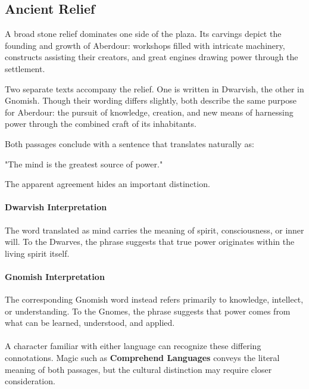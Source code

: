 \subsection*{Ancient Relief}
{\entryfont A broad stone relief dominates one side of the plaza. Its carvings depict the founding and growth of Aberdour: workshops filled with intricate machinery, constructs assisting their creators, and great engines drawing power through the settlement.

Two separate texts accompany the relief. One is written in Dwarvish, the other in Gnomish. Though their wording differs slightly, both describe the same purpose for Aberdour: the pursuit of knowledge, creation, and new means of harnessing power through the combined craft of its inhabitants.

Both passages conclude with a sentence that translates naturally as:}
\begin{DndReadAloud}
	"The mind is the greatest source of power."	
\end{DndReadAloud}
{\noindent\entryfont The apparent agreement hides an important distinction.
\paragraph*{Dwarvish Interpretation} The word translated as mind carries the meaning of spirit, consciousness, or inner will. To the Dwarves, the phrase suggests that true power originates within the living spirit itself.
\paragraph*{Gnomish Interpretation} The corresponding Gnomish word instead refers primarily to knowledge, intellect, or understanding. To the Gnomes, the phrase suggests that power comes from what can be learned, understood, and applied.\\\\
A character familiar with either language can recognize these differing connotations. Magic such as \textbf{Comprehend Languages} conveys the literal meaning of both passages, but the cultural distinction may require closer consideration.}